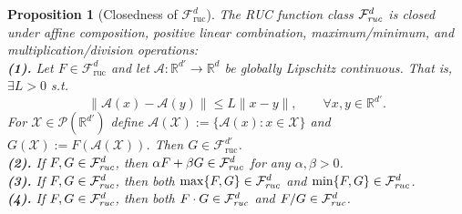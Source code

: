 \documentclass{article}
\newtheorem{proposition}[theorem]{Proposition}
\newcommand{\cX}{\mathcal{X}}
\newcommand{\cF}{\mathcal{F}}
\newcommand{\cP}{\mathcal{P}}
\begin{document}
\begin{proposition}[Closedness of $\cF_{\text{ruc}}^d$]
\label{proposition:closed}
The RUC function class $\cF_{\emph{ruc}}^d$ is closed under affine composition, positive linear combination, maximum/minimum, and multiplication/division operations:\vspace{0.1cm} \\
\textbf{\emph{(1).}}
Let $F \in \cF_{\mathrm{ruc}}^d$ and let 
$\mathcal{A}:\mathbb{R}^{d'} \to \mathbb{R}^d$ be globally Lipschitz continuous. That is,   $\exists L>0$ s.t.
\[
    \|\mathcal{A}(x) - \mathcal{A}(y)\|
    \le L \|x-y\|,
    \qquad \forall x,y \in \mathbb{R}^{d'}.
\]
For $\cX \in \cP(\mathbb{R}^{d'})$ define 
$\mathcal{A}(\cX) := \{\mathcal{A}(x): x\in\cX\}$ and
$G(\cX) := F(\mathcal{A}(\cX))$.
Then $G \in \cF_{\mathrm{ruc}}^{d'}$.\\
\textbf{\emph{(2)}.}  If $F,G\in\cF_{\emph{ruc}}^{d}$, then $\alpha F+\beta G\in\cF_{\emph{ruc}}^{d}$ for any $\alpha,\beta>0$.\vspace{0.1cm}\\
\textbf{\emph{(3)}.} If $F,G\in\cF_{\emph{ruc}}^{d}$, then both $ \max\{F,G\}\in\cF_{\emph{ruc}}^{d}$ and $\min\{F,G\}\in\cF_{\emph{ruc}}^{d}$.\vspace{0.1cm}\\
\textbf{\emph{(4)}.} If  $F,G\in\cF_{\emph{ruc}}^{d}$, then both $F\cdot G\in\cF_{\emph{ruc}}^{d}$ and $F/G\in\cF_{\emph{ruc}}^{d}$.
\end{proposition}
\end{document}
